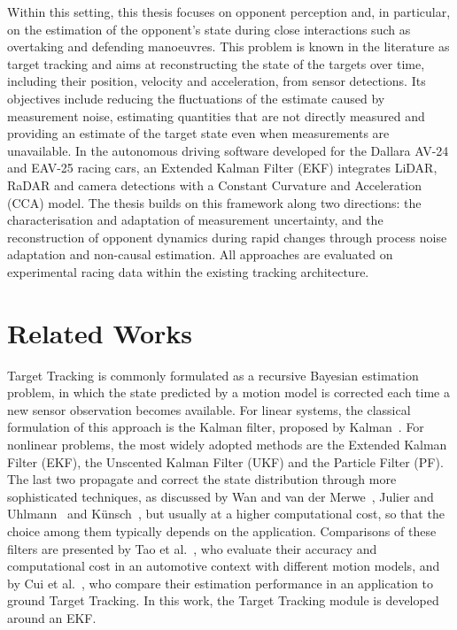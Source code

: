 Within this setting, this thesis focuses on opponent perception and, in particular, on the estimation of the opponent's state during close interactions such as overtaking and defending manoeuvres. This problem is known in the literature as target tracking and aims at reconstructing the state of the targets over time, including their position, velocity and acceleration, from sensor detections. Its objectives include reducing the fluctuations of the estimate caused by measurement noise, estimating quantities that are not directly measured and providing an estimate of the target state even when measurements are unavailable. In the autonomous driving software developed for the Dallara AV-24 and EAV-25 racing cars, an Extended Kalman Filter (EKF) integrates LiDAR, RaDAR and camera detections with a Constant Curvature and Acceleration (CCA) model. The thesis builds on this framework along two directions: the characterisation and adaptation of measurement uncertainty, and the reconstruction of opponent dynamics during rapid changes through process noise adaptation and non-causal estimation. All approaches are evaluated on experimental racing data within the existing tracking architecture.

\section{Related Works}
\label{sec:intro_related}

Target Tracking is commonly formulated as a recursive Bayesian estimation problem, in which the state predicted by a motion model is corrected each time a new sensor observation becomes available. For linear systems, the classical formulation of this approach is the Kalman filter, proposed by Kalman~\cite{kalman1960}. For nonlinear problems, the most widely adopted methods are the Extended Kalman Filter (EKF), the Unscented Kalman Filter (UKF) and the Particle Filter (PF). The last two propagate and correct the state distribution through more sophisticated techniques, as discussed by Wan and van der Merwe~\cite{wan2000}, Julier and Uhlmann~\cite{julier2004} and K\"unsch~\cite{kunsch2013}, but usually at a higher computational cost, so that the choice among them typically depends on the application. Comparisons of these filters are presented by Tao et al.~\cite{tao2021}, who evaluate their accuracy and computational cost in an automotive context with different motion models, and by Cui et al.~\cite{cui2005}, who compare their estimation performance in an application to ground Target Tracking. In this work, the Target Tracking module is developed around an EKF.

